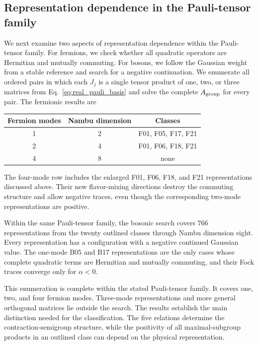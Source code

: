 \documentclass[onecolumn,aps,prb,amsmath,amssymb,superscriptaddress,longbibliography,floatfix]{revtex4-2}
\begin{document}
\subsection{Representation dependence in the Pauli-tensor family}

We next examine two aspects of representation dependence within the
Pauli-tensor family.  For fermions, we check whether all quadratic operators
are Hermitian and mutually commuting.  For bosons, we follow the Gaussian
weight from a stable reference and search for a negative continuation.  We
enumerate all ordered pairs in
which each \(J_j\) is a single tensor product of one, two, or three matrices
from Eq.~\eqref{eq:real_pauli_basis} and solve the complete \(A_{\rm group}\)
for every pair.  The fermionic results are
\begin{center}
\begin{ruledtabular}
\begin{tabular}{ccc}
Fermion modes & Nambu dimension & Classes \\
\hline
1 & 2 & F01, F05, F17, F21 \\
2 & 4 & F01, F06, F18, F21 \\
4 & 8 & none
\end{tabular}
\end{ruledtabular}
\end{center}
The four-mode row includes the enlarged F01, F06, F18, and F21 representations
discussed above.  Their new flavor-mixing directions destroy the commuting
structure and allow negative traces, even though the corresponding two-mode
representations are positive.

Within the same Pauli-tensor family, the bosonic search covers \(766\)
representations from the twenty outlined classes through Nambu dimension
eight.  Every representation has a configuration with a negative continued
Gaussian value.  The one-mode B05 and B17 representations are the only cases
whose complete quadratic terms are Hermitian and mutually commuting, and their
Fock traces converge only for \(\alpha<0\).

This enumeration is complete within the stated Pauli-tensor family.  It covers
one, two, and four fermion modes.  Three-mode representations and more general
orthogonal matrices lie outside the search.  The results establish the main
distinction needed for the classification.  The five relations determine the
contraction-semigroup structure, while the positivity of all maximal-subgroup
products in an outlined class can depend on the physical representation.


\end{document}
